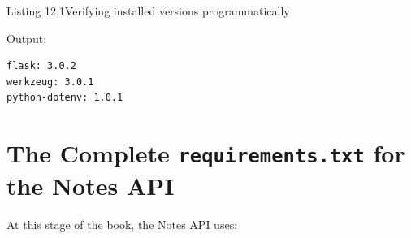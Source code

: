\begin{codeboxcap}[short]{\textcolor{accent}{Listing 12.1}\enspace Verifying installed versions programmatically}

\begin{Shaded}
\begin{Highlighting}[]

\OperatorTok{=}\NormalTok{ [}\NormalTok{, }\NormalTok{, }\NormalTok{]}
    \NormalTok{:}
\OperatorTok{=}
        \NormalTok{(}\SpecialCharTok{\{}\SpecialCharTok{\}}\SpecialStringTok{: }\SpecialCharTok{\{}\SpecialCharTok{\}}\NormalTok{)}
        \NormalTok{(}\SpecialCharTok{\{}\SpecialCharTok{\}}\NormalTok{)}
\end{Highlighting}
\end{Shaded}

\end{codeboxcap}

\noindent{}Output:

\begin{outputbox}[short]
\begin{Verbatim}[fontsize=\codesize, breaklines, breakanywhere, breaksymbolleft={\tiny\textcolor{muted}{$\hookrightarrow$}}]
flask: 3.0.2
werkzeug: 3.0.1
python-dotenv: 1.0.1
\end{Verbatim}
\end{outputbox}

\setcounter{section}{4}
\section{\texorpdfstring{The Complete \texttt{requirements.txt} for the Notes API}{The Complete requirements.txt for the Notes API}}\label{12-dependency-declaration:125-the-complete-requirementstxt-for-the-notes-api}

At this stage of the book, the Notes API uses:

